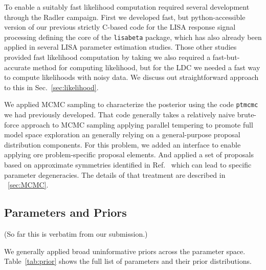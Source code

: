 \documentclass[aps,showpacs,12pt,onecolumn,prd,superscriptaddress,nofootinbib]{revtex4}
\begin{document}
To enable a suitably fast likelihood computation required several development through the Radler campaign.  First we developed fast, but python-accessible version of our previous strictly C-based code for the LISA response signal processing defining the core of the \texttt{lisabeta} package, which has also already been applied in several LISA parameter estimation studies. Those other studies provided fast likelihood computation by taking we also required a fast-but-accurate method for computing likelihood, but for the LDC we needed a fast way to compute likelihoods with noisy data. We discuss out straightforward approach to this in Sec.~\ref{sec:likelihood}.

We applied MCMC sampling to characterize the posterior using the code \texttt{ptmcmc} we had previously developed.  That code generally takes a relatively naive brute-force approach to MCMC sampling applying parallel tempering to promote full model space exploration an generally relying on a general-purpose proposal distribution components. For this problem, we added an interface to enable applying ore problem-specific proposal elements. And applied a set of proposals based on approximate symmetries identified in Ref.~\cite{Marsat2020} which can lead to specific parameter degeneracies. The details of that treatment are described in ~\ref{sec:MCMC}.

\subsection{ Parameters and Priors }
\label{sed:definition}
(So far this is verbatim from our submission.)


We generally applied broad uninformative priors across the parameter space. Table~\ref{tab:prior} shows the full list of parameters and their prior distributions.
\end{document}
